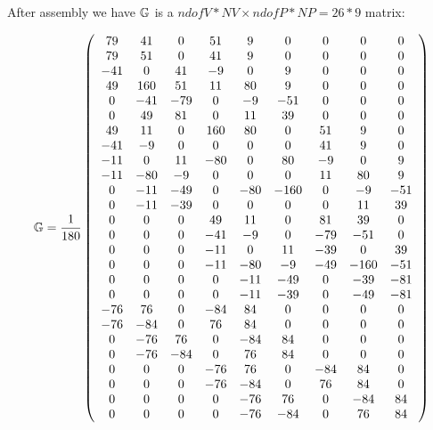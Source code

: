 After assembly we have ${\mathbb{G}}$ is a $ndofV*NV\times ndofP*NP=26*9$ matrix:

\[
{\mathbb{G}}=
\frac{1}{180}
\left(
\begin{array}{ccccccccc}
 79  &  41 &   0 &  51 &   9 &    0 &   0 &   0 &   0 \\ 
 79  &  51 &   0 &  41 &   9 &    0 &   0 &   0 &   0 \\ 
-41  &   0 &  41 &  -9 &   0 &    9 &   0 &   0 &   0 \\ 
 49  & 160 &  51 &  11 &  80 &    9 &   0 &   0 &   0 \\ 
  0  & -41 & -79 &   0 &  -9 &  -51 &   0 &   0 &   0 \\ 
  0  &  49 &  81 &   0 &  11 &   39 &   0 &   0 &   0 \\ 
 49  &  11 &   0 & 160 &  80 &    0 &  51 &   9 &   0 \\ 
-41  &  -9 &   0 &   0 &   0 &    0 &  41 &   9 &   0 \\ 
-11  &   0 &  11 & -80 &   0 &   80 &  -9 &   0 &   9 \\ 
-11  & -80 &  -9 &   0 &   0 &    0 &  11 &  80 &   9 \\ 
  0  & -11 & -49 &   0 & -80 &  -160 &   0 &  -9 & -51 \\ 
  0  & -11 & -39 &   0 &   0 &    0 &   0 &  11 &  39 \\ 
  0  &   0 &   0 &  49 &  11 &    0 &  81 &  39 &   0 \\ 
  0  &   0 &   0 & -41 &  -9 &    0 & -79 & -51 &   0 \\ 
  0  &   0 &   0 & -11 &   0 &   11 & -39 &   0 &  39 \\ 
  0  &   0 &   0 & -11 & -80 &   -9 & -49 & -160 & -51 \\ 
  0  &   0 &   0 &   0 & -11 &  -49 &   0 & -39 & -81 \\ 
  0  &   0 &   0 &   0 & -11 &  -39 &   0 & -49 & -81 \\ 
-76  &  76 &   0 & -84 &  84 &    0 &   0 &   0 &   0 \\ 
-76  & -84 &   0 &  76 &  84 &    0 &   0 &   0 &   0 \\ 
  0  & -76 &  76 &   0 & -84 &   84 &   0 &   0 &   0 \\ 
  0  & -76 & -84 &   0 &  76 &   84 &   0 &   0 &   0 \\ 
  0  &   0 &   0 & -76 &  76 &    0 & -84 &  84 &   0 \\ 
  0  &   0 &   0 & -76 & -84 &    0 &  76 &  84 &   0 \\ 
  0  &   0 &   0 &   0 & -76 &   76 &   0 & -84 &  84 \\ 
  0  &   0 &   0 &   0 & -76 &  -84 &   0 &  76 &  84 
\end{array}
\right)
\]
